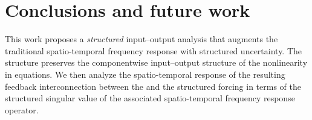 

\section{Conclusions and future work}
\label{sec:conclusion}




This work proposes a \emph{structured} input--output analysis that augments the traditional spatio-temporal frequency response with structured uncertainty. The structure preserves the componentwise input--output structure of the nonlinearity in  equations. We then analyze the spatio-temporal response of the resulting feedback interconnection between the  and the structured forcing  in terms of the structured singular value of the associated spatio-temporal frequency response operator.




